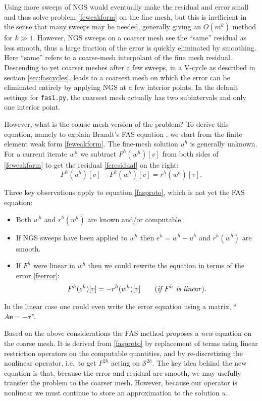 \documentclass[letterpaper,final,12pt,reqno]{amsart}
\newcommand{\be}{\mathbf{e}}
\newcommand{\br}{\mathbf{r}}
\begin{document}
Using more sweeps of NGS would eventually make the residual and error small and thus solve problem \eqref{feweakform} on the fine mesh, but this is inefficient in the sense that many sweeps may be needed, generally giving an $O(m^k)$ method for $k\gg 1$.  However, NGS sweeps on a coarser mesh see the ``same'' residual as less smooth, thus a large fraction of the error is quickly eliminated by smoothing.  Here ``same'' refers to a coarse-mesh interpolant of the fine mesh residual.  Descending to yet coarser meshes after a few sweeps, in a V-cycle as described in section \ref{sec:fascycles}, leads to a coarsest mesh on which the error can be eliminated entirely by applying NGS at a few interior points.  In the default settings for \texttt{fas1.py}, the coarsest mesh actually has two subintervals and only one interior point.

However, what is the coarse-mesh version of the problem?  To derive this equation, namely to explain Brandt's FAS equation \cite{Brandt1977}, we start from the finite element weak form \eqref{feweakform}.  The fine-mesh solution $u^h$ is generally unknown.  For a current iterate $w^h$ we subtract $F^h(w^h)[v]$ from both sides of \eqref{feweakform} to get the residual \eqref{feresidual} on the right:
\begin{equation}
  F^h(u^h)[v] - F^h(w^h)[v] = r^h(w^h)[v]. \label{fasproto}
\end{equation}

Three key observations apply to equation \eqref{fasproto}, which is not yet the FAS equation:
\begin{itemize}
\item Both $w^h$ and $r^h(w^h)$ are known and/or computable.
\item If NGS sweeps have been applied to $w^h$ then $e^h=w^h-u^h$ and $r^h(w^h)$ are smooth.
\item If $F^h$ were linear in $w^h$ then we could rewrite the equation in terms of the error \eqref{feerror}:
    $$F^h(e^h)[v] = -r^h(w^h)[v] \qquad (\text{\emph{if $F^h$ is linear}}).$$
\end{itemize}
In the linear case one could even write the error equation using a matrix, ``$A\be=-\br$''.

Based on the above considerations the FAS method proposes a \emph{new} equation on the coarse mesh.  It is derived from \eqref{fasproto} by replacement of terms using linear restriction operators on the computable quantities, and by re-discretizing the nonlinear operator, i.e.~to get $F^{2h}$ acting on $\mathcal{S}^{2h}$.  The key idea behind the new equation is that, because the error and residual are smooth, we may usefully transfer the problem to the coarser mesh.  However, because our operator is nonlinear we must continue to store an approximation to the solution $u$.
\end{document}
